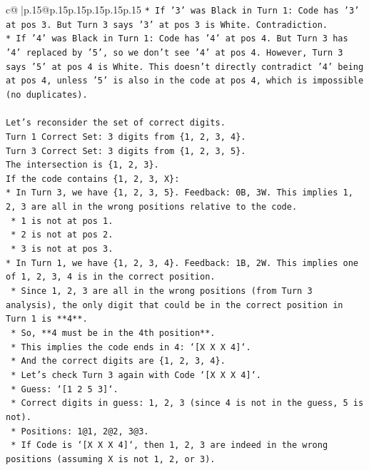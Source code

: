 \documentclass{article}
\begin{document}
{\begin{supertabular}{c@{$\;$}|p{.15\linewidth}@{}p{.15\linewidth}p{.15\linewidth}p{.15\linewidth}p{.15\linewidth}p{.15\linewidth}}
{{{\texttt{*   If '3' was Black in Turn 1: Code has '3' at pos 3. But Turn 3 says '3' at pos 3 is White. Contradiction.} \\
\texttt{*   If '4' was Black in Turn 1: Code has '4' at pos 4. But Turn 3 has '4' replaced by '5', so we don't see '4' at pos 4. However, Turn 3 says '5' at pos 4 is White. This doesn't directly contradict '4' being at pos 4, unless '5' is also in the code at pos 4, which is impossible (no duplicates).} \\
\\ 
\texttt{Let's reconsider the set of correct digits.} \\
\texttt{Turn 1 Correct Set: 3 digits from \{1, 2, 3, 4\}.} \\
\texttt{Turn 3 Correct Set: 3 digits from \{1, 2, 3, 5\}.} \\
\texttt{The intersection is \{1, 2, 3\}.} \\
\texttt{If the code contains \{1, 2, 3, X\}:} \\
\texttt{*   In Turn 3, we have \{1, 2, 3, 5\}. Feedback: 0B, 3W. This implies 1, 2, 3 are all in the wrong positions relative to the code.} \\
\texttt{    *   1 is not at pos 1.} \\
\texttt{    *   2 is not at pos 2.} \\
\texttt{    *   3 is not at pos 3.} \\
\texttt{*   In Turn 1, we have \{1, 2, 3, 4\}. Feedback: 1B, 2W. This implies one of 1, 2, 3, 4 is in the correct position.} \\
\texttt{    *   Since 1, 2, 3 are all in the wrong positions (from Turn 3 analysis), the only digit that could be in the correct position in Turn 1 is **4**.} \\
\texttt{    *   So, **4 must be in the 4th position**.} \\
\texttt{    *   This implies the code ends in 4: `{[}X X X 4{]}`.} \\
\texttt{    *   And the correct digits are \{1, 2, 3, 4\}.} \\
\texttt{    *   Let's check Turn 3 again with Code `{[}X X X 4{]}`.} \\
\texttt{        *   Guess: `{[}1 2 5 3{]}`.} \\
\texttt{        *   Correct digits in guess: 1, 2, 3 (since 4 is not in the guess, 5 is not).} \\
\texttt{        *   Positions: 1@1, 2@2, 3@3.} \\
\texttt{        *   If Code is `{[}X X X 4{]}`, then 1, 2, 3 are indeed in the wrong positions (assuming X is not 1, 2, or 3).} \\
}}}
\end{supertabular}}
\end{document}
